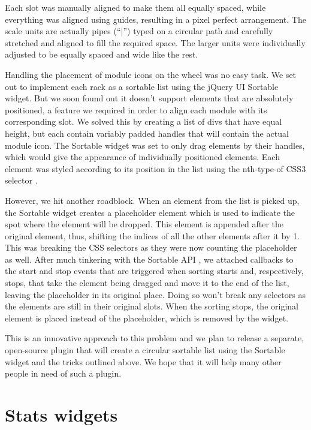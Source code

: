 Each slot was manually aligned to make them all equally spaced, while everything was aligned using guides, resulting in a pixel perfect arrangement. The scale units are actually pipes (“|”) typed on a circular path and carefully stretched and aligned to fill the required space. The larger units were individually adjusted to be equally spaced and wide like the rest.

Handling the placement of module icons on the wheel was no easy task. We set out to implement each rack as a sortable list using the jQuery UI Sortable widget. But we soon found out it doesn’t support elements that are absolutely positioned, a feature we required in order to align each module with its corresponding slot. We solved this by creating a list of divs that have equal height, but each contain variably padded handles that will contain the actual module icon. The Sortable widget was set to only drag elements by their handles, which would give the appearance of individually positioned elements. Each element was styled according to its position in the list using the nth-type-of CSS3 selector \cite{nthtypeof}.

However, we hit another roadblock. When an element from the list is picked up, the Sortable widget creates a placeholder element which is used to indicate the spot where the element will be dropped. This element is appended after the original element, thus, shifting the indices of all the other elements after it by 1. This was breaking the CSS selectors as they were now counting the placeholder as well. After much tinkering with the Sortable API \cite{sortable}, we attached callbacks to the start and stop events that are triggered when sorting starts and, respectively, stops, that take the element being dragged and move it to the end of the list, leaving the placeholder in its original place. Doing so won’t break any selectors as the elements are still in their original slots. When the sorting stops, the original element is placed instead of the placeholder, which is removed by the widget.

This is an innovative approach to this problem and we plan to release a separate, open-source plugin that will create a circular sortable list using the Sortable widget and the tricks outlined above. We hope that it will help many other people in need of such a plugin.

\section{Stats widgets}

